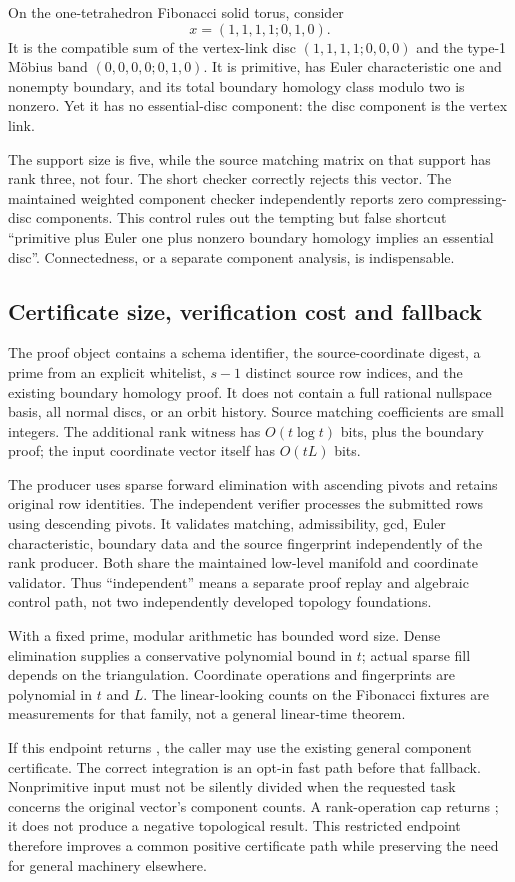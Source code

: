 On the one-tetrahedron Fibonacci solid torus, consider
\[
 x=(1,1,1,1;0,1,0).
\]
It is the compatible sum of the vertex-link disc $(1,1,1,1;0,0,0)$ and the type-1 M\"obius band $(0,0,0,0;0,1,0)$. It is primitive, has Euler characteristic one and nonempty boundary, and its total boundary homology class modulo two is nonzero. Yet it has no essential-disc component: the disc component is the vertex link.

The support size is five, while the source matching matrix on that support has rank three, not four. The short checker correctly rejects this vector. The maintained weighted component checker independently reports zero compressing-disc components. This control rules out the tempting but false shortcut ``primitive plus Euler one plus nonzero boundary homology implies an essential disc''. Connectedness, or a separate component analysis, is indispensable.

\subsection{Certificate size, verification cost and fallback}

The proof object contains a schema identifier, the source-coordinate digest, a prime from an explicit whitelist, $s-1$ distinct source row indices, and the existing boundary homology proof. It does not contain a full rational nullspace basis, all normal discs, or an orbit history. Source matching coefficients are small integers. The additional rank witness has $O(t\log t)$ bits, plus the boundary proof; the input coordinate vector itself has $O(tL)$ bits.

The producer uses sparse forward elimination with ascending pivots and retains original row identities. The independent verifier processes the submitted rows using descending pivots. It validates matching, admissibility, gcd, Euler characteristic, boundary data and the source fingerprint independently of the rank producer. Both share the maintained low-level manifold and coordinate validator. Thus ``independent'' means a separate proof replay and algebraic control path, not two independently developed topology foundations.

With a fixed prime, modular arithmetic has bounded word size. Dense elimination supplies a conservative polynomial bound in $t$; actual sparse fill depends on the triangulation. Coordinate operations and fingerprints are polynomial in $t$ and $L$. The linear-looking counts on the Fibonacci fixtures are measurements for that family, not a general linear-time theorem.

If this endpoint returns , the caller may use the existing general component certificate. The correct integration is an opt-in fast path before that fallback. Nonprimitive input must not be silently divided when the requested task concerns the original vector's component counts. A rank-operation cap returns ; it does not produce a negative topological result. This restricted endpoint therefore improves a common positive certificate path while preserving the need for general machinery elsewhere.
